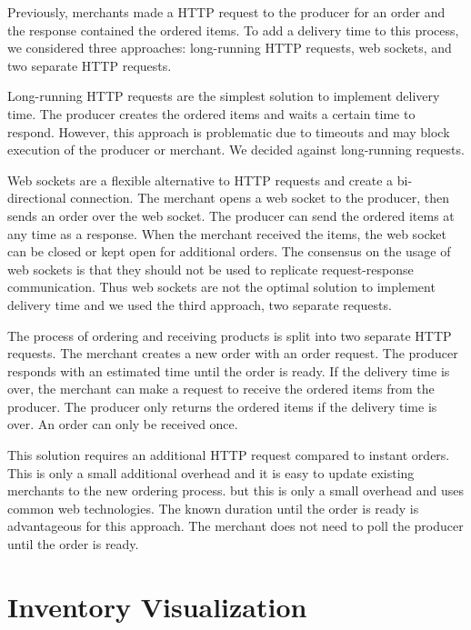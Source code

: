 Previously, merchants made a HTTP request to the producer for an order and the response contained the ordered items.
To add a delivery time to this process, we considered three approaches: long-running HTTP requests, web sockets, and two separate HTTP requests. 

Long-running HTTP requests are the simplest solution to implement delivery time.
The producer creates the ordered items and waits a certain time to respond.
However, this approach is problematic due to timeouts and may block execution of the producer or merchant.
We decided against long-running requests.

Web sockets are a flexible alternative to HTTP requests and create a bi-directional connection.
The merchant opens a web socket to the producer, then sends an order over the web socket.
The producer can send the ordered items at any time as a response.
When the merchant received the items, the web socket can be closed or kept open for additional orders.
The consensus on the usage of web sockets is that they should not be used to replicate request-response communication.
Thus web sockets are not the optimal solution to implement delivery time and we used the third approach, two separate requests.

The process of ordering and receiving products is split into two separate HTTP requests.
The merchant creates a new order with an order request.
The producer responds with an estimated time until the order is ready.
If the delivery time is over, the merchant can make a request to receive the ordered items from the producer.
The producer only returns the ordered items if the delivery time is over.
An order can only be received once.

This solution requires an additional HTTP request compared to instant orders.
This is only a small additional overhead and it is easy to update existing merchants to the new ordering process.
but this is only a small overhead and uses common web technologies.
The known duration until the order is ready is advantageous for this approach.
The merchant does not need to poll the producer until the order is ready.

\section{Inventory Visualization}
\label{section:inventory_graph}

